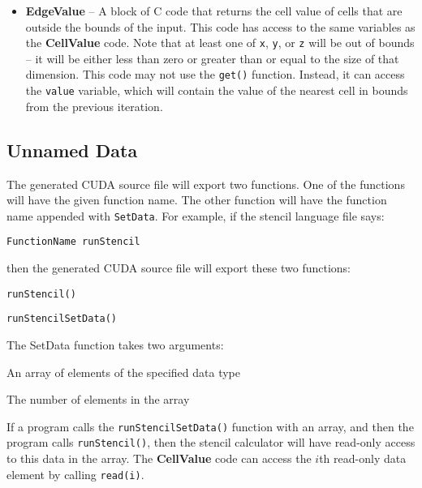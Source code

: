 \documentclass{styles/sig-alternate}
\begin{document}
\begin{itemize}
\begin{itemize}
{  z} fields, containing the total size of the input
\item All variables listed in the {\bf ScalarVariables} field.
\item {\tt get(...)} -- a function that efficiently returns values
  from the stencil from the previous iteration.  The parameters are
  relative to the current cell.  For example, in a two-dimensional
  stencil, the west and east neighbors can be retrieved with {\tt
    get(-1, 0)} and {\tt get(1, 0)}.
\end{itemize}
The block of code returns the new cell value.
\item {\bf EdgeValue} -- A block of C code that returns the cell value
  of cells that are outside the bounds of the input.  This code has
  access to the same variables as the {\bf CellValue} code.  Note that
  at least one of {\tt x}, {\tt y}, or {\tt z} will be out of bounds
  -- it will be either less than zero or greater than or equal to the
  size of that dimension.  This code may not use the {\tt get()}
  function.  Instead, it can access the {\tt value} variable, which
  will contain the value of the nearest cell in bounds from the
  previous iteration.
\end{itemize}

\subsection{Unnamed Data}

The generated CUDA source file will export two functions.  One of the
functions will have the given function name.  The other function will
have the function name appended with {\tt SetData}.  For example, if
the stencil language file says:
\begin{verbatim}
FunctionName runStencil
\end{verbatim}
then the generated CUDA source file will export these two functions:
\begin{itemize*}
\item {\tt runStencil()}
\item {\tt runStencilSetData()}
\end{itemize*}

\noindent The SetData function takes two arguments:
\begin{enumerate*}
\item An array of elements of the specified data type
\item The number of elements in the array
\end{enumerate*}
If a program calls the {\tt runStencilSetData()} function with an
array, and then the program calls {\tt runStencil()}, then the stencil
calculator will have read-only access to this data in the array.  The
{\bf CellValue} code can access the $i$th read-only data element by
calling {\tt read(i)}.
\end{document}
